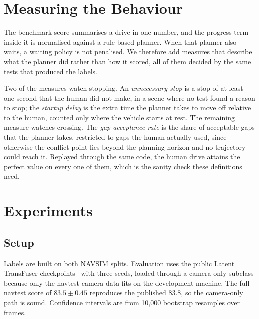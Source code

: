 \documentclass[conference]{IEEEtran}
\begin{document}
\section{Measuring the Behaviour}
\label{sec:behaviour}

The benchmark score summarises a drive in one number, and the progress term
inside it is normalised against a rule-based planner. When that planner also
waits, a waiting policy is not penalised. We therefore add measures that describe
what the planner did rather than how it scored, all of them decided by the same
tests that produced the labels.

Two of the measures watch stopping. An \emph{unnecessary stop} is a stop of at
least one second that the human did not make, in a scene where no test found a
reason to stop; the \emph{startup delay} is the extra time the planner takes to
move off relative to the human, counted only where the vehicle starts at
rest. The remaining measure watches crossing. The \emph{gap acceptance rate} is
the share of acceptable gaps that the planner takes, restricted to gaps the
human actually used, since otherwise the conflict point lies beyond the
planning horizon and no trajectory could reach it. Replayed through the same
code, the human drive attains the perfect value on every one of them, which is
the sanity check these definitions need.

\section{Experiments}

\subsection{Setup}
Labels are built on both NAVSIM splits. Evaluation uses the public Latent
TransFuser checkpoints~\cite{transfuser} with three seeds, loaded through a camera-only subclass
because only the navtest camera data fits on the development machine. The full
navtest score of $83.5 \pm 0.45$ reproduces the published 83.8, so the
camera-only path is sound. Confidence intervals are from 10{,}000 bootstrap
resamples over frames.
\end{document}
